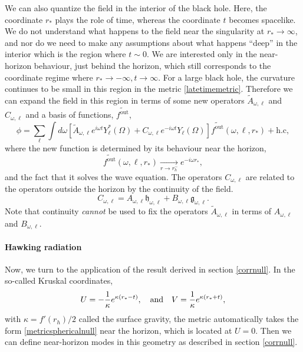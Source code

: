 \documentclass[12pt]{article}
\def\fout{f^{\text{out}}}
\def\grey{\mathfrak{g}}
\def\white{\mathfrak{h}}
\def\rtor{{r_*}}
\newcommand{\be}{\begin{equation}}
\newcommand{\ee}{\end{equation}}
\begin{document}
We can also quantize the field in the interior of the black hole. Here, the coordinate $\rtor$ plays the role of time, whereas the coordinate $t$ becomes spacelike. We do not understand what happens to the field near the singularity at $\rtor \rightarrow \infty$, and nor do we need to make any assumptions about what happens ``deep'' in the interior which is the region where $t \sim 0$.  We are interested only in the near-horizon behaviour, just behind the horizon, which still corresponds to the coordinate regime where $\rtor \rightarrow -\infty, t \rightarrow \infty$.  For a large black hole, the curvature continues to be small in this region in the  metric \eqref{latetimemetric}. Therefore we can 
expand the field in this region in terms of some new operators $\widetilde{A}_{\omega, \ell}$ and $C_{\omega, \ell}$ and a basis of functions, $\widetilde{\fout}$,
\be
\label{fieldinside}
\phi = \sum_{\ell} \int d \omega \left[\widetilde{A}_{\omega, \ell} e^{i \omega t} Y_{\ell}^*(\Omega) + C_{\omega, \ell} e^{-i \omega t} Y_{\ell}(\Omega)  \right]  \widetilde{\fout}(\omega, \ell,\rtor)   + \text{h.c},
\ee
where the new function is determined by its behaviour near the horizon,
\be
\label{ftexpansion}
\widetilde{\fout}(\omega, \ell, \rtor) \underset{r \rightarrow r_h^-}{\longrightarrow} e^{-i \omega \rtor},
\ee
and the fact that it solves the wave equation. The operators $C_{\omega, \ell}$ are related to the operators outside the horizon by the continuity of the field.\be
C_{\omega, \ell} = A_{\omega, \ell} \white_{\omega, \ell} + B_{\omega, \ell} \grey_{\omega, \ell}.
\ee
Note that continuity {\em cannot} be used to fix the operators $\widetilde{A}_{\omega, \ell}$ in terms of $A_{\omega, \ell}$ and $B_{\omega, \ell}$.


\paragraph{\bf Hawking radiation \\}
Now, we turn to the application of the result derived in section \ref{corrnull}. In the  so-called Kruskal coordinates, 
\be
\label{kruskaldef}
U = -{1 \over \kappa} e^{\kappa (\rtor - t)}, \quad \text{and} \quad V = {1 \over \kappa} e^{\kappa(\rtor + t)},
\ee
with $\kappa = f'(r_h)/2$ called the surface gravity, the metric 
automatically takes the form \eqref{metricsphericalnull} near the horizon, which is located at $U = 0$. Then we can define near-horizon modes in this geometry as described in section \ref{corrnull}.
\end{document}
